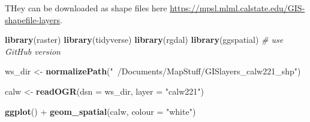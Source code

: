 \documentclass[]{book}
\newenvironment{Shaded}{\begin{snugshade}}{\end{snugshade}}
\newcommand{\KeywordTok}[1]{\textcolor[rgb]{0.13,0.29,0.53}{\textbf{{#1}}}}
\newcommand{\DataTypeTok}[1]{\textcolor[rgb]{0.13,0.29,0.53}{{#1}}}
\newcommand{\StringTok}[1]{\textcolor[rgb]{0.31,0.60,0.02}{{#1}}}
\newcommand{\CommentTok}[1]{\textcolor[rgb]{0.56,0.35,0.01}{\textit{{#1}}}}
\newcommand{\NormalTok}[1]{{#1}}
\theoremstyle{definition}
\theoremstyle{definition}
\theoremstyle{remark}
\begin{document}
THey can be downloaded as shape files here
\url{https://mpsl.mlml.calstate.edu/GIS-shapefile-layers}.

\begin{Shaded}
\begin{Highlighting}[]
\KeywordTok{library}\NormalTok{(raster)}
\KeywordTok{library}\NormalTok{(tidyverse)}
\KeywordTok{library}\NormalTok{(rgdal)}
\KeywordTok{library}\NormalTok{(ggspatial)  }\CommentTok{# use GitHub version}


\NormalTok{ws_dir <-}\StringTok{ }\KeywordTok{normalizePath}\NormalTok{(}\StringTok{"~/Documents/MapStuff/GISlayers_calw221_shp"}\NormalTok{)}

\NormalTok{calw <-}\StringTok{ }\KeywordTok{readOGR}\NormalTok{(}\DataTypeTok{dsn =} \NormalTok{ws_dir, }
        \DataTypeTok{layer =} \StringTok{"calw221"}\NormalTok{)}

\KeywordTok{ggplot}\NormalTok{() +}
\StringTok{  }\KeywordTok{geom_spatial}\NormalTok{(calw, }\DataTypeTok{colour =} \StringTok{"white"}\NormalTok{)}
\end{Highlighting}
\end{Shaded}


\end{document}
